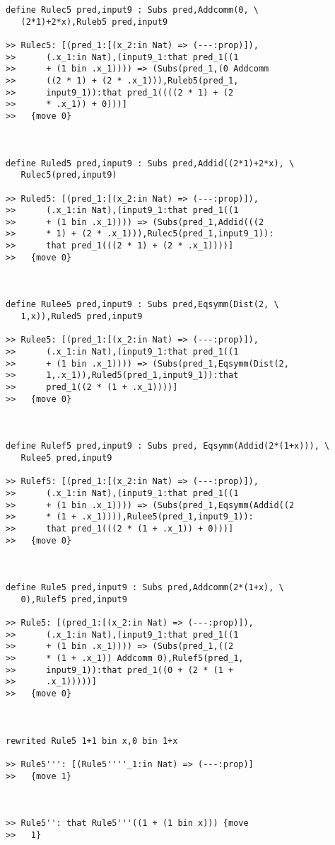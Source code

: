 \documentclass{article}
\begin{document}
\begin{verbatim}
define Rulec5 pred,input9 : Subs pred,Addcomm(0, \
   (2*1)+2*x),Ruleb5 pred,input9

>> Rulec5: [(pred_1:[(x_2:in Nat) => (---:prop)]),
>>      (.x_1:in Nat),(input9_1:that pred_1((1
>>      + (1 bin .x_1)))) => (Subs(pred_1,(0 Addcomm
>>      ((2 * 1) + (2 * .x_1))),Ruleb5(pred_1,
>>      input9_1)):that pred_1((((2 * 1) + (2
>>      * .x_1)) + 0)))]
>>   {move 0}



define Ruled5 pred,input9 : Subs pred,Addid((2*1)+2*x), \
   Rulec5(pred,input9)

>> Ruled5: [(pred_1:[(x_2:in Nat) => (---:prop)]),
>>      (.x_1:in Nat),(input9_1:that pred_1((1
>>      + (1 bin .x_1)))) => (Subs(pred_1,Addid(((2
>>      * 1) + (2 * .x_1))),Rulec5(pred_1,input9_1)):
>>      that pred_1(((2 * 1) + (2 * .x_1))))]
>>   {move 0}



define Rulee5 pred,input9 : Subs pred,Eqsymm(Dist(2, \
   1,x)),Ruled5 pred,input9

>> Rulee5: [(pred_1:[(x_2:in Nat) => (---:prop)]),
>>      (.x_1:in Nat),(input9_1:that pred_1((1
>>      + (1 bin .x_1)))) => (Subs(pred_1,Eqsymm(Dist(2,
>>      1,.x_1)),Ruled5(pred_1,input9_1)):that
>>      pred_1((2 * (1 + .x_1))))]
>>   {move 0}



define Rulef5 pred,input9 : Subs pred, Eqsymm(Addid(2*(1+x))), \
   Rulee5 pred,input9

>> Rulef5: [(pred_1:[(x_2:in Nat) => (---:prop)]),
>>      (.x_1:in Nat),(input9_1:that pred_1((1
>>      + (1 bin .x_1)))) => (Subs(pred_1,Eqsymm(Addid((2
>>      * (1 + .x_1)))),Rulee5(pred_1,input9_1)):
>>      that pred_1(((2 * (1 + .x_1)) + 0)))]
>>   {move 0}



define Rule5 pred,input9 : Subs pred,Addcomm(2*(1+x), \
   0),Rulef5 pred,input9

>> Rule5: [(pred_1:[(x_2:in Nat) => (---:prop)]),
>>      (.x_1:in Nat),(input9_1:that pred_1((1
>>      + (1 bin .x_1)))) => (Subs(pred_1,((2
>>      * (1 + .x_1)) Addcomm 0),Rulef5(pred_1,
>>      input9_1)):that pred_1((0 + (2 * (1 +
>>      .x_1)))))]
>>   {move 0}



rewrited Rule5 1+1 bin x,0 bin 1+x

>> Rule5''': [(Rule5''''_1:in Nat) => (---:prop)]
>>   {move 1}



>> Rule5'': that Rule5'''((1 + (1 bin x))) {move
>>   1}




\end{verbatim}
\end{document}

